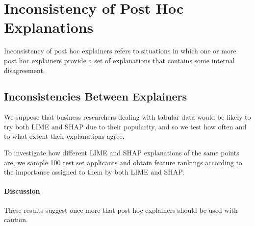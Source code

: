 \documentclass[11pt]{article}    %
\begin{document}
\section{Inconsistency of Post Hoc Explanations}
         Inconsistency of post hoc explainers refers to situations in which one or more post hoc explainers provide a set of explanations that contains some internal disagreement.

        

       \subsection{Inconsistencies Between Explainers}
        \label{sec:conflict_between}
                We suppose that business researchers dealing with tabular data would be likely to try both LIME and SHAP due to their popularity, and so we test how often and to what extent their explanations agree. 
    
            To investigate how different LIME and SHAP explanations of the same points are, we sample 100 test set applicants and obtain feature rankings according to the importance assigned to them by both LIME and SHAP.

            
            \paragraph{Discussion}
            These results suggest once more that post hoc explainers should be used with caution.

        
\end{document}
